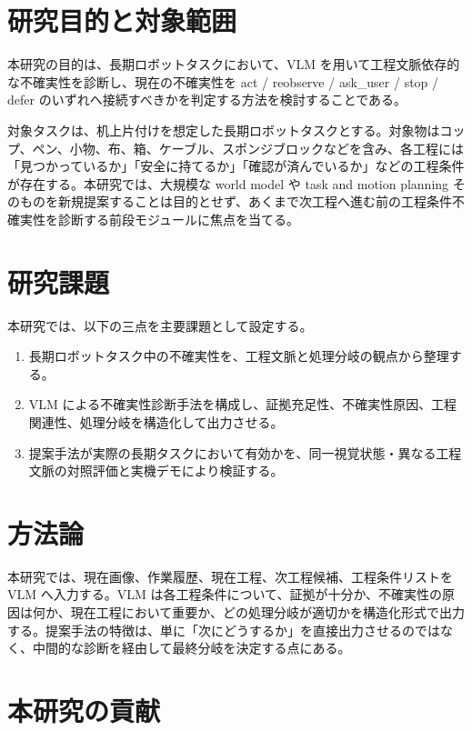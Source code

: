 \section{研究目的と対象範囲}

本研究の目的は、長期ロボットタスクにおいて、VLM を用いて工程文脈依存的な不確実性を診断し、現在の不確実性を act / reobserve / ask\_user / stop / defer のいずれへ接続すべきかを判定する方法を検討することである。

対象タスクは、机上片付けを想定した長期ロボットタスクとする。対象物はコップ、ペン、小物、布、箱、ケーブル、スポンジブロックなどを含み、各工程には「見つかっているか」「安全に持てるか」「確認が済んでいるか」などの工程条件が存在する。本研究では、大規模な world model や task and motion planning そのものを新規提案することは目的とせず、あくまで次工程へ進む前の工程条件不確実性を診断する前段モジュールに焦点を当てる。

\section{研究課題}

本研究では、以下の三点を主要課題として設定する。
\begin{enumerate}
  \item 長期ロボットタスク中の不確実性を、工程文脈と処理分岐の観点から整理する。
  \item VLM による不確実性診断手法を構成し、証拠充足性、不確実性原因、工程関連性、処理分岐を構造化して出力させる。
  \item 提案手法が実際の長期タスクにおいて有効かを、同一視覚状態・異なる工程文脈の対照評価と実機デモにより検証する。
\end{enumerate}

\section{方法論}

本研究では、現在画像、作業履歴、現在工程、次工程候補、工程条件リストを VLM へ入力する。VLM は各工程条件について、証拠が十分か、不確実性の原因は何か、現在工程において重要か、どの処理分岐が適切かを構造化形式で出力する。提案手法の特徴は、単に「次にどうするか」を直接出力させるのではなく、中間的な診断を経由して最終分岐を決定する点にある。

\section{本研究の貢献}

